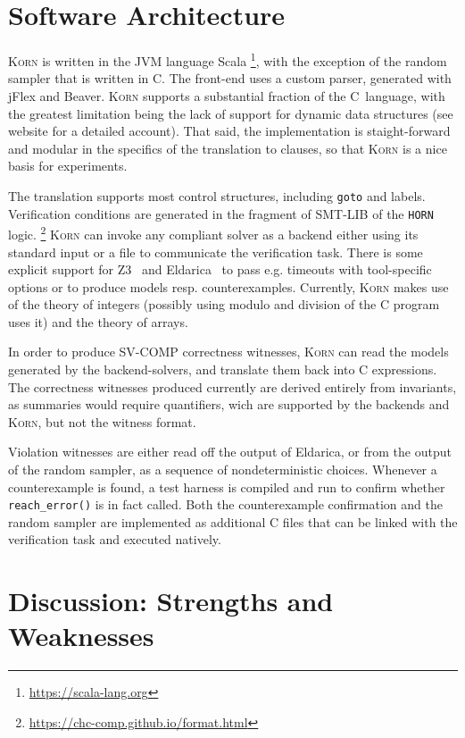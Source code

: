 \documentclass{llncs}
\newcommand{\Korn}{\textsc{Korn}\xspace}
\begin{document}
\section{Software Architecture}
\label{sec:architecture}

\Korn is written in the JVM language Scala%
    \footnote{\url{https://scala-lang.org}}, with the exception of the random sampler that is written in C.
The front-end uses a custom parser, generated with jFlex and Beaver.
\Korn supports a substantial fraction of the C~language, with the greatest limitation
being the lack of support for dynamic data structures (see website for a detailed account).
That said, the implementation is staight-forward and modular in the specifics of the translation
to clauses, so that \Korn is a nice basis for experiments.

The translation supports most control structures, including \texttt{goto} and labels.
Verification conditions are generated in the fragment of SMT-LIB of the \texttt{HORN} logic.%
    \footnote{\url{https://chc-comp.github.io/format.html}}
\Korn can invoke any compliant solver as a backend either using its standard input or a file to communicate the verification task.
There is some explicit support for Z3~\cite{gurfinkel2019science} and Eldarica~\cite{hojjat2018eldarica}
to pass e.g. timeouts with tool-specific options or to produce models resp. counterexamples.
Currently, \Korn makes use of the theory of integers (possibly using modulo and division of the C program uses it) and the theory of arrays.

In order to produce SV-COMP correctness witnesses, \Korn can read the models generated by the backend-solvers, and translate them back into C expressions.
The correctness witnesses produced currently are derived entirely from invariants,
as summaries would require quantifiers, wich are supported by the backends and \Korn, but not the witness format.

Violation witnesses are either read off the output of Eldarica,
or from the output of the random sampler, as a sequence of nondeterministic choices.
Whenever a counterexample is found, a test harness is compiled and run to confirm whether \texttt{reach\_error()} is in fact called.
Both the counterexample confirmation and the random sampler are implemented
as additional C files that can be linked with the verification task and executed natively.

\section{Discussion: Strengths and Weaknesses}
\label{sec:discussion}
\end{document}
